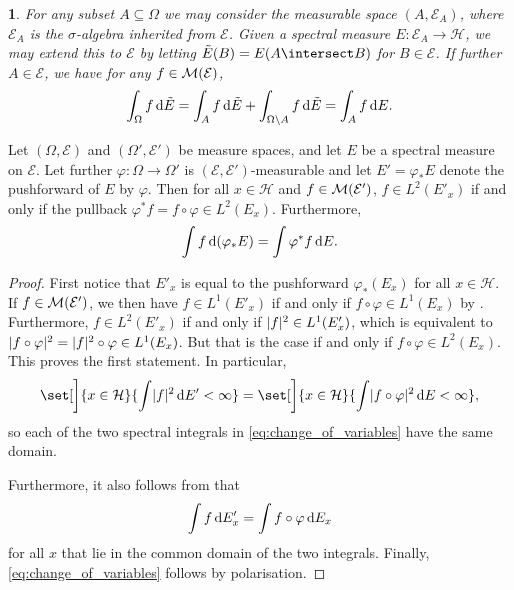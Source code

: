 \documentclass[article, a4paper, 11pt, oneside]{memoir}
\makeatletter
\let\phi\varphi
\numberwithin{equation}{chapter}
\newcommand{\calH}{\mathcal{H}}
\newcommand{\calE}{\mathcal{E}}
\theoremstyle{myexample}
\newtheorem{remark}[theorem]{\protect\@remark}
\theoremstyle{myexample}
\theoremstyle{myexamplebreak}
\theoremstyle{myexamplebreak}
\theoremstyle{nonumberplain}
\newtheorem{proof}{\protect\@proof}
\theoremstyle{MyNonumberplain}
\newcommand{\@remark}{}
\newcommand{\@proof}{}
\renewcommand{\@remark}{Remark}%
\renewcommand{\@proof}{Proof}%
\renewcommand{\@remark}{Bemærkning}%
\renewcommand{\@proof}{Bevis}%
\makeatother
\begin{document}
\begin{remark}
    \label{rem:spectral_measure_subset}
    For any subset $A \subseteq \Omega$ we may consider the measurable space $(A, \calE_A)$, where $\calE_A$ is the $\sigma$-algebra inherited from $\calE$. Given a spectral measure $E \colon \calE_A \to \calH$, we may extend this to $\calE$ by letting $\tilde E(B) = E(A \intersect B)$ for $B \in \calE$. If further $A \in \calE$, we have for any $f \in \measurable(\calE)$,
    \begin{equation*}
        \int_\Omega f \mathop{}\!\mathrm{d} \tilde E
            = \int_A f \mathop{}\!\mathrm{d} \tilde E + \int_{\Omega \setminus A} f \mathop{}\!\mathrm{d} \tilde E
            = \int_A f \mathop{}\!\mathrm{d} E.
    \end{equation*}
\end{remark}


\begin{proposition}
    \label{thm:change_of_variables}
    Let $(\Omega, \calE)$ and $(\Omega', \calE')$ be measure spaces, and let $E$ be a spectral measure on $\calE$. Let further $\phi \colon \Omega \to \Omega'$ is $(\calE, \calE')$-measurable and let $E' = \phi_* E$ denote the pushforward of $E$ by $\phi$. Then for all $x \in \calH$ and $f \in \measurable(\calE')$, $f \in L^2(E'_x)$ if and only if the pullback $\phi^* f = f \circ \phi \in L^2(E_x)$. Furthermore,
    \begin{equation}
        \label{eq:change_of_variables}
        \int f \dif (\phi_* E) = \int \phi^* f \dif E.
    \end{equation}
\end{proposition}

\begin{proof}
    First notice that $E'_x$ is equal to the pushforward $\phi_*(E_x)$ for all $x \in \calH$. If $f \in \measurable(\calE')$, we then have $f \in L^1(E'_x)$ if and only if $f \circ \phi \in L^1(E_x)$ by \textcite[Sætning~11.1.4]{thorbjoernsen2014}. Furthermore, $f \in L^2(E'_x)$ if and only if $\lvert f\rvert^2 \in L^1(E'_x)$, which is equivalent to $\abs{f \circ \phi}^2 = \abs{f}^2 \circ \phi \in L^1(E_x)$. But that is the case if and only if $f \circ \phi \in L^2(E_x)$. This proves the first statement. In particular,
    \begin{equation*}
        \set[\bigg]{x \in \calH}{ \int \abs{f}^2 \dif E' < \infty }
            = \set[\bigg]{x \in \calH}{ \int \abs{f \circ \phi}^2 \dif E < \infty },
    \end{equation*}
    so each of the two spectral integrals in \eqref{eq:change_of_variables} have the same domain.
    
    Furthermore, it also follows from \textcite[Sætning~11.1.4]{thorbjoernsen2014} that
    \begin{equation*}
        \int f \dif E'_x
            = \int f \circ \phi \dif E_x
    \end{equation*}
    for all $x$ that lie in the common domain of the two integrals. Finally, \eqref{eq:change_of_variables} follows by polarisation.
\end{proof}
\end{document}
